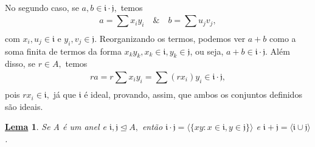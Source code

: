 \documentclass{article}
\newtheorem*{lemma*}{\underline{Lema}}
\begin{document}
  No segundo caso, se \(a, b\in \mathfrak{i}\cdot \mathfrak{j},\) temos 
  \[
    a = \sum\limits_{}^{}x_{i}y_{i}\quad\&\quad b = \sum\limits_{}^{}u_{j}v_{j},
  \]
com \(x_{i}, u_{j}\in \mathfrak{i}\) e \(y_{i}, v_{j}\in \mathfrak{j}.\) Reorganizando os termos, podemos ver
 \(a+b\) como a soma finita de termos da forma \(x_{k}y_{k}, x_{k}\in \mathfrak{i}, y_{k}\in \mathfrak{j}\), ou seja, 
 \(a+b\in \mathfrak{i}\cdot \mathfrak{j}\). Além disso, se \(r\in A,\) temos 
  \[
    ra = r \sum\limits_{}^{}x_{i}y_{i} = \sum\limits_{}^{}(rx_{i})y_{i}\in \mathfrak{i}\cdot \mathfrak{j},
  \]
pois \(rx_{i}\in \mathfrak{i},\) já que \(\mathfrak{i}\) é ideal, provando, assim, que ambos os conjuntos definidos são ideais.
\begin{lemma*}
  Se A é um anel e \(\mathfrak{i}, \mathfrak{j}\trianglelefteq{A},\) então \(\mathfrak{i}\cdot \mathfrak{j}=\langle \{xy: x\in \mathfrak{i}, y\in \mathfrak{j}\} \rangle\) e
 \(\mathfrak{i}+\mathfrak{j} = \langle \mathfrak{i}\cup \mathfrak{j} \rangle\).
\end{lemma*}
\end{document}
